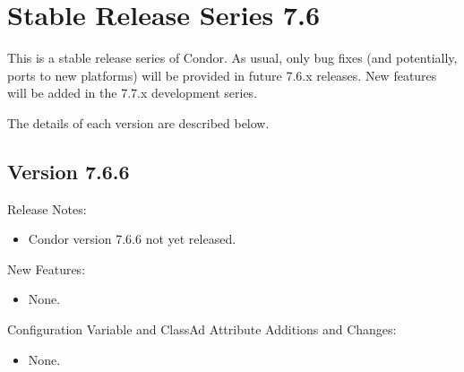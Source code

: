 
\section{\label{sec:History-7-6}Stable Release Series 7.6}

This is a stable release series of Condor.
As usual, only bug fixes (and potentially, ports to new platforms)
will be provided in future 7.6.x releases.
New features will be added in the 7.7.x development series.

The details of each version are described below.

\subsection*{\label{sec:New-7-6-6}Version 7.6.6}

\noindent Release Notes:

\begin{itemize}

\item Condor version 7.6.6 not yet released.

\end{itemize}


\noindent New Features:

\begin{itemize}

\item None.

\end{itemize}

\noindent Configuration Variable and ClassAd Attribute Additions and Changes:

\begin{itemize}

\item None.

\end{itemize}

